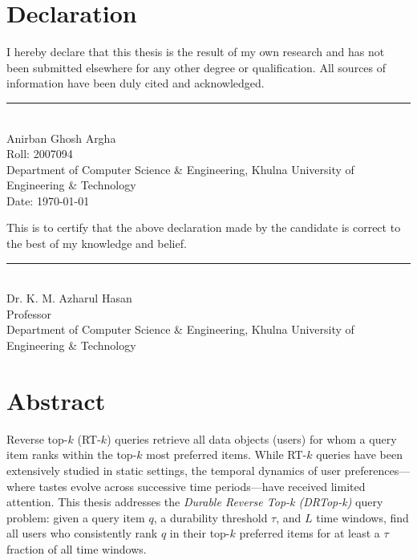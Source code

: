 \documentclass[
  12pt,
  english,
  oneside,
]{report}
\newcommand{\authorname}{Anirban Ghosh Argha}
\newcommand{\rollnumber}{2007094}
\newcommand{\supname}{Dr. K. M. Azharul Hasan}
\newcommand{\supdesig}{Professor}
\newcommand{\deptname}{Department of Computer Science \& Engineering}
\newcommand{\univname}{Khulna University of Engineering \& Technology}
\begin{document}
\chapter*{Declaration}

I hereby declare that this thesis is the result of my own research and has not been submitted elsewhere for any other degree or qualification. All sources of information have been duly cited and acknowledged.

\vspace{2cm}

\begin{flushright}
  \rule{0.4\linewidth}{0.5pt} \\
  \authorname \\
  Roll: \rollnumber \\
  \deptname, \univname \\
  Date: \today
\end{flushright}

\vspace{1cm}

This is to certify that the above declaration made by the candidate is correct to the best of my knowledge and belief.

\vspace{2cm}

\begin{flushright}
  \rule{0.4\linewidth}{0.5pt} \\
  \supname \\
  \supdesig \\
  \deptname, \univname
\end{flushright}

\chapter*{Abstract}

Reverse top-$k$ (RT-$k$) queries retrieve all data objects (users) for whom a query item ranks within the top-$k$ most preferred items. While RT-$k$ queries have been extensively studied in static settings, the temporal dynamics of user preferences---where tastes evolve across successive time periods---have received limited attention. This thesis addresses the \textit{Durable Reverse Top-k (DRTop-k)} query problem: given a query item $q$, a durability threshold $\tau$, and $L$ time windows, find all users who consistently rank $q$ in their top-$k$ preferred items for at least a $\tau$ fraction of all time windows.
\end{document}
